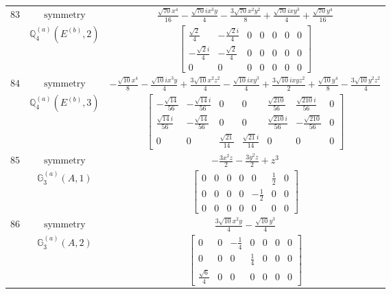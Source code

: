 \documentclass[fleqn,8pt,landscape]{jsarticle}
\begin{document}
\begin{longtable}{ccc}
$ 83 $ & $ \text{symmetry} $ & $ \frac{\sqrt{70} x^{4}}{16} - \frac{\sqrt{70} i x^{3} y}{4} - \frac{3 \sqrt{70} x^{2} y^{2}}{8} + \frac{\sqrt{70} i x y^{3}}{4} + \frac{\sqrt{70} y^{4}}{16} $ \\
$  $ & $ \mathbb{Q}_{4}^{(a)}(E^{(b)},2) $ & $ \begin{bmatrix} \frac{\sqrt{2}}{4} & - \frac{\sqrt{2} i}{4} & 0 & 0 & 0 & 0 & 0 \\ - \frac{\sqrt{2} i}{4} & - \frac{\sqrt{2}}{4} & 0 & 0 & 0 & 0 & 0 \\ 0 & 0 & 0 & 0 & 0 & 0 & 0 \end{bmatrix} $ \\ \hline
$ 84 $ & $ \text{symmetry} $ & $ - \frac{\sqrt{10} x^{4}}{8} - \frac{\sqrt{10} i x^{3} y}{4} + \frac{3 \sqrt{10} x^{2} z^{2}}{4} - \frac{\sqrt{10} i x y^{3}}{4} + \frac{3 \sqrt{10} i x y z^{2}}{2} + \frac{\sqrt{10} y^{4}}{8} - \frac{3 \sqrt{10} y^{2} z^{2}}{4} $ \\
$  $ & $ \mathbb{Q}_{4}^{(a)}(E^{(b)},3) $ & $ \begin{bmatrix} - \frac{\sqrt{14}}{56} & - \frac{\sqrt{14} i}{56} & 0 & 0 & \frac{\sqrt{210}}{56} & \frac{\sqrt{210} i}{56} & 0 \\ \frac{\sqrt{14} i}{56} & - \frac{\sqrt{14}}{56} & 0 & 0 & \frac{\sqrt{210} i}{56} & - \frac{\sqrt{210}}{56} & 0 \\ 0 & 0 & \frac{\sqrt{21}}{14} & \frac{\sqrt{21} i}{14} & 0 & 0 & 0 \end{bmatrix} $ \\ \hline
$ 85 $ & $ \text{symmetry} $ & $ - \frac{3 x^{2} z}{2} - \frac{3 y^{2} z}{2} + z^{3} $ \\
$  $ & $ \mathbb{G}_{3}^{(a)}(A,1) $ & $ \begin{bmatrix} 0 & 0 & 0 & 0 & 0 & \frac{1}{2} & 0 \\ 0 & 0 & 0 & 0 & - \frac{1}{2} & 0 & 0 \\ 0 & 0 & 0 & 0 & 0 & 0 & 0 \end{bmatrix} $ \\ \hline
$ 86 $ & $ \text{symmetry} $ & $ \frac{3 \sqrt{10} x^{2} y}{4} - \frac{\sqrt{10} y^{3}}{4} $ \\
$  $ & $ \mathbb{G}_{3}^{(a)}(A,2) $ & $ \begin{bmatrix} 0 & 0 & - \frac{1}{4} & 0 & 0 & 0 & 0 \\ 0 & 0 & 0 & \frac{1}{4} & 0 & 0 & 0 \\ \frac{\sqrt{6}}{4} & 0 & 0 & 0 & 0 & 0 & 0 \end{bmatrix} $ \\ \hline

\end{longtable}
\end{document}
